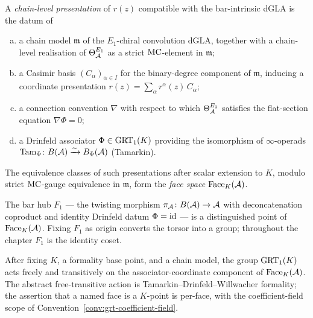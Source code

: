 \begin{definition}
A \emph{chain-level presentation} of $r(z)$ compatible with the
bar-intrinsic dGLA is the datum of
\begin{enumerate}[(a)]
\item a chain model $\mathfrak{m}$ of the $E_1$-chiral convolution
dGLA, together with a chain-level realisation of $\Theta_{\mathcal{A}}^{E_1}$
as a strict $\mathrm{MC}$-element in $\mathfrak{m}$;
\item a Casimir basis $(C_\alpha)_{\alpha\in I}$ for the
binary-degree component of $\mathfrak{m}$, inducing a coordinate
presentation $r(z) = \sum_\alpha r^\alpha(z)\,C_\alpha$;
\item a connection convention $\nabla$ with respect to which
$\Theta_{\mathcal{A}}^{E_1}$ satisfies the flat-section equation
$\nabla\Phi = 0$;
\item a Drinfeld associator $\Phi\in\mathrm{GRT}_1(K)$ providing the
isomorphism of $\infty$-operads
$\mathrm{Tam}_\Phi\colon B(\mathcal{A})\xrightarrow{\sim} B_\Phi(\mathcal{A})$ (Tamarkin).
\end{enumerate}
The equivalence classes of such presentations after scalar
extension to $K$, modulo strict $\mathrm{MC}$-gauge equivalence in
$\mathfrak{m}$, form the \emph{face space} $\mathrm{Face}_K(\mathcal{A})$.
\end{definition}

\begin{remark}
\label{rem:f1-base-point}
The bar hub $F_1$ — the twisting morphism
$\pi_{\mathcal{A}}\colon B(\mathcal{A})\to\mathcal{A}$ with deconcatenation coproduct and
identity Drinfeld datum $\Phi = \mathrm{id}$ — is a distinguished point of
$\mathrm{Face}_K(\mathcal{A})$. Fixing $F_1$ as origin converts the torsor into a
group; throughout the chapter $F_1$ is the identity coset.
\end{remark}

\begin{proposition}
\label{prop:grt-action-face}
After fixing $K$, a formality base point, and a chain model, the
group $\mathrm{GRT}_1(K)$ acts freely and transitively on the
associator-coordinate component of $\mathrm{Face}_K(\mathcal{A})$. The abstract
free-transitive action is Tamarkin--Drinfeld--Willwacher formality;
the assertion that a named face is a $K$-point is per-face, with
the coefficient-field scope of
Convention~\ref{conv:grt-coefficient-field}.
\end{proposition}

